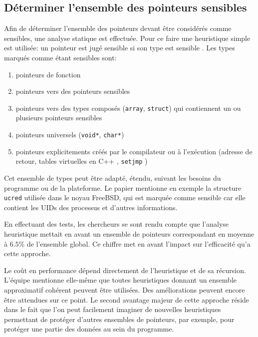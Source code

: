 \subsection{Déterminer l'ensemble des pointeurs sensibles}

Afin de déterminer l'ensemble des pointeurs devant être considérés comme sensibles, une analyse statique est effectuée. Pour ce faire une heuristique simple est utilisée: \og un pointeur est jugé sensible si son type est sensible \fg. Les types marqués comme étant sensibles sont:

\begin{enumerate}
	\item pointeurs de fonction
	\item pointeurs vers des pointeurs sensibles
	\item pointeurs vers des types composés (\texttt{array}, \texttt{struct}) qui contiennent un ou plusieurs pointeurs sensibles
	\item pointeurs universels (\texttt{void*}, \texttt{char*})
  \item pointeurs explicitements créés par le compilateur ou à l'exécution (adresse de retour, tables virtuelles en C++ \cite{fonctionsVirtuelles}, \texttt{setjmp} \cite{setjmp})
\end{enumerate}

Cet ensemble de types peut être adapté, étendu, suivant les besoins du programme ou de la plateforme. Le papier mentionne en exemple la structure \texttt{ucred} utilisée dans le noyau FreeBSD, qui est marquée comme sensible car elle contient les UIDs des processus et d'autres informations.

En effectuant des tests, les chercheurs se sont rendu compte que l'analyse heuristique mettait en avant un ensemble de pointeurs correspondant en moyenne à $6.5\%$ de l'ensemble global. Ce chiffre met en avant l'impact sur l'efficacité qu'a cette approche.

Le coût en performance dépend directement de l'heuristique et de sa récursion. L'équipe mentionne elle-même que toutes heuristiques donnant un ensemble approximatif cohérent peuvent être utilisées. Des améliorations peuvent encore être attendues sur ce point. Le second avantage majeur de cette approche réside dans le fait que l'on peut facilement imaginer de nouvelles heuristiques permettant de protéger d'autres ensembles de pointeurs, par exemple, pour protéger une partie des données au sein du programme.

